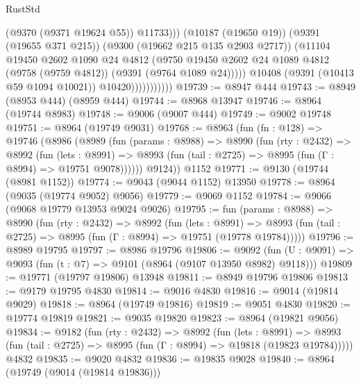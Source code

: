 \begin{lexlean}{RustStd}
\begin{coremodule}
                                  (@9370 (@9371 @19624 @55))
                                  @11733)))
                            (@10187 (@19650 @19))
                            (@9391 (@19655 @371 @215))
                            (@9300 (@19662 @215 @135 @2903 @2717))
                            (@11104
                              @19450
                              @2602
                              @1090
                              @24
                              @4812
                              (@9750
                                @19450
                                @2602
                                @24
                                @1089
                                @4812
                                (@9758 (@9759 @4812))
                                (@9391 (@9764 @1089 @24)))))
                          @10408
                          (@9391 (@10413 @59 @1094 @10021))
                          @10420)))))))))))
@19739 := @8947 @444
@19743 := @8949 (@8953 @444) (@8959 @444)
@19744 := @8968 @13947
@19746 := @8964 (@19744 @8983)
@19748 := @9006 (@9007 @444)
@19749 := @9002 @19748
@19751 := @8964 (@19749 @9031)
@19768 := @8963
    (fun (fn : @128) =>
    @19746
      (@8986
        (@8989
          (fun (params : @8988) =>
          @8990
            (fun (rty : @2432) =>
            @8992
              (fun (lets : @8991) =>
              @8993 (fun (tail : @2725) => @8995 (fun (Γ : @8994) => @19751 @9078))))))
        @9124))
    @1152
@19771 := @9130 (@19744 (@8981 @1152))
@19774 := @9043 (@9044 @1152) @13950
@19778 := @8964 (@9035 (@19774 @9052) @9056)
@19779 := @9069 @1152
@19784 := @9066 (@9068 @19779 @13953 @9024 @9026)
@19795 := fun (params : @8988) =>
  @8990
    (fun (rty : @2432) =>
    @8992
      (fun (lets : @8991) =>
      @8993 (fun (tail : @2725) => @8995 (fun (Γ : @8994) => @19751 (@19778 @19784)))))
@19796 := @8989 @19795
@19797 := @8986 @19796
@19806 := @9092
    (fun (U : @9091) => @9093 (fun (t : @7) => @9101 (@8964 (@9107 @13950 @8982) @9118)))
@19809 := @19771 (@19797 @19806) @13948
@19811 := @8949 @19796 @19806
@19813 := @9179 @19795 @4830
@19814 := @9016 @4830
@19816 := @9014 (@19814 @9029)
@19818 := @8964 (@19749 @19816)
@19819 := @9051 @4830
@19820 := @19774 @19819
@19821 := @9035 @19820
@19823 := @8964 (@19821 @9056)
@19834 := @9182
    (fun (rty : @2432) =>
    @8992
      (fun (lets : @8991) =>
      @8993 (fun (tail : @2725) => @8995 (fun (Γ : @8994) => @19818 (@19823 @19784)))))
    @4832
@19835 := @9020 @4832
@19836 := @19835 @9028
@19840 := @8964 (@19749 (@9014 (@19814 @19836)))

\end{coremodule}
\end{lexlean}
